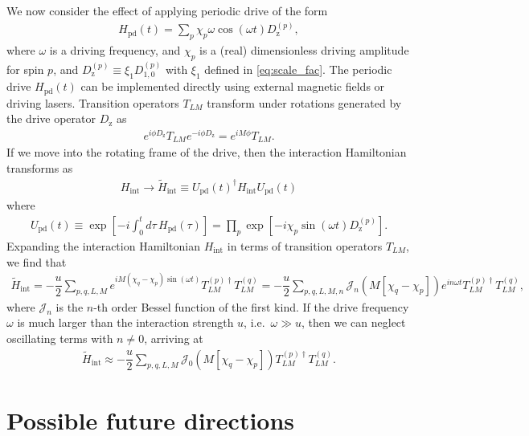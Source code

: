 \documentclass[nofootinbib,notitlepage,11pt]{revtex4-2}
\renewcommand{\t}{\text} %
\newcommand{\f}[2]{\dfrac{#1}{#2}} %
\newcommand{\p}[1]{\left(#1\right)} %
\renewcommand{\sp}[1]{\left[#1\right]} %
\newcommand{\1}{\mathds{1}}
\newcommand{\z}{\text{z}}
\newcommand{\J}{\mathcal{J}}
\begin{document}
We now consider the effect of applying periodic drive of the form
\begin{align}
  H_{\t{pd}}\p{t} = \sum_p \chi_p \omega \cos\p{\omega t} D_\z^{(p)},
\end{align}
where $\omega$ is a driving frequency, and $\chi_p$ is a (real)
dimensionless driving amplitude for spin $p$, and
$D_\z^{(p)} \equiv \xi_1 D_{1,0}^{(p)}$ with $\xi_1$ defined in
\eqref{eq:scale_fac}.  The periodic drive $H_{\t{pd}}\p{t}$ can be
implemented directly using external magnetic fields or driving lasers.
Transition operators $T_{LM}$ transform under rotations generated by
the drive operator $D_\z$ as
\begin{align}
  e^{i\phi D_\z} T_{LM} e^{-i\phi D_\z} = e^{iM\phi} T_{LM}.
\end{align}
If we move into the rotating frame of the drive, then the interaction
Hamiltonian transforms as
\begin{align}
  H_{\t{int}} \to \tilde H_{\t{int}}
  \equiv U_{\t{pd}}\p{t}^\dag H_{\t{int}} U_{\t{pd}}\p{t}
\end{align}
where
\begin{align}
  U_{\t{pd}}\p{t} \equiv \exp\sp{-i\int_0^td\tau\,H_{\t{pd}}\p{\tau}}
  = \prod_p \exp\sp{-i \chi_p \sin\p{\omega t} D_\z^{(p)}}.
\end{align}
Expanding the interaction Hamiltonian $H_{\t{int}}$ in terms of
transition operators $T_{LM}$, we find that
\begin{align}
  \tilde H_{\t{int}}
  = -\f{u}{2} \sum_{p,q,L,M} e^{iM\p{\chi_q-\chi_p}\sin\p{\omega t}}
  T_{LM}^{(p)\dag} T_{LM}^{(q)}
  = -\f{u}{2} \sum_{p,q,L,M,n}
  \J_n\p{M\sp{\chi_q-\chi_p}} e^{in\omega t}
  T_{LM}^{(p)\dag} T_{LM}^{(q)},
\end{align}
where $\J_n$ is the $n$-th order Bessel function of the first kind.
If the drive frequency $\omega$ is much larger than the interaction
strength $u$, i.e.~$\omega\gg u$, then we can neglect oscillating
terms with $n\ne0$, arriving at
\begin{align}
  \tilde H_{\t{int}} \approx -\f{u}{2} \sum_{p,q,L,M}
  \J_0\p{M\sp{\chi_q-\chi_p}}
  T_{LM}^{(p)\dag} T_{LM}^{(q)}.
\end{align}




\vspace{5cm}

\section{Possible future directions}
\end{document}
